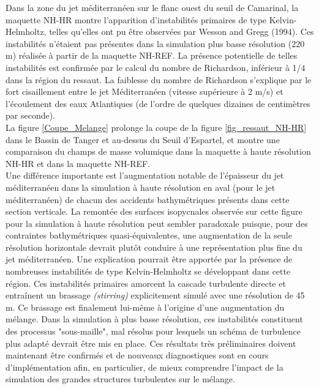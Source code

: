 \documentclass[a4paper,11pt]{report}
\begin{document}
Dans la zone du jet méditerranéen sur le flanc ouest du seuil de Camarinal, la maquette NH-HR montre l'apparition d'instabilités primaires de type Kelvin-Helmholtz, telles qu'elles ont pu être observées par Wesson and Gregg (1994). Ces instabilités n'étaient pas présentes dans la simulation plus basse résolution (220 m) réalisée à partir de la maquette NH-REF. La présence potentielle de telles instabilités est confirmée par le calcul du nombre de Richardson, inférieur à 1/4 dans la région du ressaut. La faiblesse du nombre de Richardson s'explique par le fort cisaillement entre le jet Méditerranéen (vitesse supérieure à 2 m/s) et l'écoulement des eaux Atlantiques (de l'ordre de quelques dizaines de centimètres par seconde).\\
La figure \ref{Coupe_Melange} prolonge la coupe de la figure \ref{fig_ressaut_NH-HR} dans le Bassin de Tanger et au-dessus du Seuil d'Espartel, et montre une comparaison du champs de masse volumique dans la maquette à haute résolution NH-HR et dans la maquette NH-REF.\\
Une différence importante est l'augmentation notable de l'épaisseur du jet méditerranéen dans la simulation à haute résolution en aval (pour le jet méditerranéen) de chacun des accidents bathymétriques présents dans cette section verticale. La remontée des surfaces isopycnales observée sur cette figure pour la simulation à haute résolution peut sembler paradoxale puisque, pour des contraintes bathymétriques quasi-équivalentes, une augmentation de la seule résolution horizontale devrait plutôt conduire à une représentation plus fine du jet méditerranéen. Une explication pourrait être apportée par la présence de nombreuses instabilités de type Kelvin-Helmholtz se développant dans cette région. Ces instabilités primaires amorcent la cascade turbulente directe et entraînent un brassage \textit{(stirring)} explicitement simulé avec une résolution de 45 m. Ce brassage est finalement lui-même à l'origine d'une augmentation du mélange. Dans la simulation à plus basse résolution, ces instabilités constituent des processus "sous-maille", mal résolus pour lesquels un schéma de turbulence plus adapté devrait être mis en place. Ces résultats très préliminaires doivent maintenant être confirmés et de nouveaux diagnostiques sont en cours d'implémentation afin, en particulier, de mieux comprendre l'impact de la simulation des grandes structures turbulentes sur le mélange.\\
\end{document}
